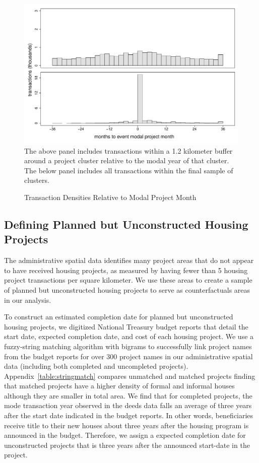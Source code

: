 \documentclass[12pt]{article}
\begin{document}
\begin{figure}
\caption{Transaction Densities Relative to Modal Project Month}\label{figure:densitytime}
\centering
\includegraphics[scale=.5]{figures/summary_densitytime.pdf} \\
The above panel includes transactions within a 1.2 kilometer buffer around a project cluster relative to the modal year of that cluster.  The below panel includes all transactions within the final sample of clusters.
\end{figure}


\subsection{Defining Planned but Unconstructed Housing Projects}

The administrative spatial data identifies many project areas that do not appear to have received housing projects, as measured by having fewer than 5 housing project transactions per square kilometer.  We use these areas to create a sample of planned but unconstructed housing projects to serve as counterfactuals areas in our analysis.

To construct an estimated completion date for planned but unconstructed housing projects, we digitized National Treasury budget reports that detail the start date, expected completion date, and cost of each housing project.  We use a fuzzy-string matching algorithm with bigrams to successfully link project names from the budget reports for over 300 project names in our administrative spatial data (including both completed and uncompleted projects).  Appendix~\ref{table:stringmatch} compares unmatched and matched projects finding that matched projects have a higher density of formal and informal houses although they are smaller in total area.  We find that for completed projects, the mode transaction year observed in the deeds data falls an average of three years after the start date indicated in the budget reports.  In other words, beneficiaries receive title to their new houses about three years after the housing program is announced in the budget.  Therefore, we assign a expected completion date for unconstructed projects that is three years after the announced start-date in the project.  
\end{document}
